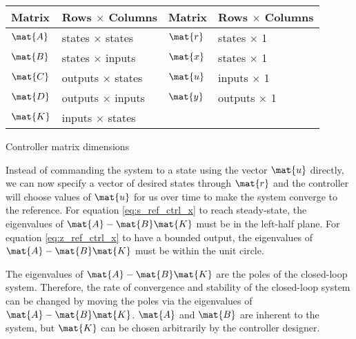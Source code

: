 \begin{booktable}
  \begin{tabular}{|ll|ll|}
    \hline
    \rowcolor{headingbg}
    \textbf{Matrix} & \textbf{Rows $\times$ Columns} &
    \textbf{Matrix} & \textbf{Rows $\times$ Columns} \\
    \hline
    $\mat{A}$ & states $\times$ states & $\mat{r}$ & states $\times$ 1 \\
    $\mat{B}$ & states $\times$ inputs & $\mat{x}$ & states $\times$ 1 \\
    $\mat{C}$ & outputs $\times$ states & $\mat{u}$ & inputs $\times$ 1 \\
    $\mat{D}$ & outputs $\times$ inputs & $\mat{y}$ & outputs $\times$ 1 \\
    $\mat{K}$ & inputs $\times$ states &  &  \\
    \hline
  \end{tabular}
  \caption{Controller matrix dimensions}
\end{booktable}

Instead of commanding the \gls{system} to a \gls{state} using the vector
$\mat{u}$ directly, we can now specify a vector of desired \glspl{state} through
$\mat{r}$ and the \gls{controller} will choose values of $\mat{u}$ for us over
time to make the \gls{system} converge to the \gls{reference}. For equation
\eqref{eq:s_ref_ctrl_x} to reach steady-state, the eigenvalues of
$\mat{A} - \mat{B}\mat{K}$ must be in the left-half plane. For equation
\eqref{eq:z_ref_ctrl_x} to have a bounded output, the eigenvalues of
$\mat{A} - \mat{B}\mat{K}$ must be within the unit circle.

The eigenvalues of $\mat{A} - \mat{B}\mat{K}$ are the poles of the closed-loop
\gls{system}. Therefore, the rate of convergence and stability of the
closed-loop \gls{system} can be changed by moving the poles via the eigenvalues
of $\mat{A} - \mat{B}\mat{K}$. $\mat{A}$ and $\mat{B}$ are inherent to the
\gls{system}, but $\mat{K}$ can be chosen arbitrarily by the controller
designer.
